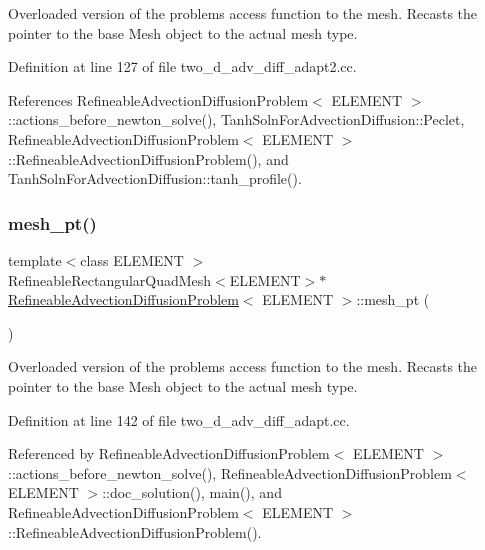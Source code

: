 Overloaded version of the problem\textquotesingle{}s access function to the mesh. Recasts the pointer to the base Mesh object to the actual mesh type. 



Definition at line 127 of file two\+\_\+d\+\_\+adv\+\_\+diff\+\_\+adapt2.\+cc.



References Refineable\+Advection\+Diffusion\+Problem$<$ E\+L\+E\+M\+E\+N\+T $>$\+::actions\+\_\+before\+\_\+newton\+\_\+solve(), Tanh\+Soln\+For\+Advection\+Diffusion\+::\+Peclet, Refineable\+Advection\+Diffusion\+Problem$<$ E\+L\+E\+M\+E\+N\+T $>$\+::\+Refineable\+Advection\+Diffusion\+Problem(), and Tanh\+Soln\+For\+Advection\+Diffusion\+::tanh\+\_\+profile().

\mbox{\label{classRefineableAdvectionDiffusionProblem_abe616b5b3d3e4d3c0d3be777e3b3ac34}} 
\subsubsection{\texorpdfstring{mesh\+\_\+pt()}{mesh\_pt()}\hspace{0.1cm}{\footnotesize\ttfamily [2/2]}}
{\footnotesize\ttfamily template$<$class E\+L\+E\+M\+E\+NT $>$ \\
Refineable\+Rectangular\+Quad\+Mesh$<$E\+L\+E\+M\+E\+NT$>$$\ast$ \hyperlink{classRefineableAdvectionDiffusionProblem}{Refineable\+Advection\+Diffusion\+Problem}$<$ E\+L\+E\+M\+E\+NT $>$\+::mesh\+\_\+pt (\begin{DoxyParamCaption}{ }\end{DoxyParamCaption})\hspace{0.3cm}{\ttfamily [inline]}}



Overloaded version of the problem\textquotesingle{}s access function to the mesh. Recasts the pointer to the base Mesh object to the actual mesh type. 



Definition at line 142 of file two\+\_\+d\+\_\+adv\+\_\+diff\+\_\+adapt.\+cc.



Referenced by Refineable\+Advection\+Diffusion\+Problem$<$ E\+L\+E\+M\+E\+N\+T $>$\+::actions\+\_\+before\+\_\+newton\+\_\+solve(), Refineable\+Advection\+Diffusion\+Problem$<$ E\+L\+E\+M\+E\+N\+T $>$\+::doc\+\_\+solution(), main(), and Refineable\+Advection\+Diffusion\+Problem$<$ E\+L\+E\+M\+E\+N\+T $>$\+::\+Refineable\+Advection\+Diffusion\+Problem().



